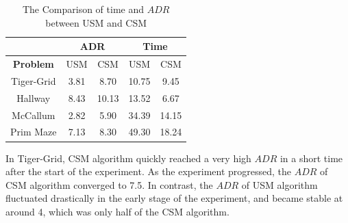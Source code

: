 \documentclass[conference]{IEEEtran}
\begin{document}
	\begin{table}[b]
		\caption{The Comparison of time and $ADR$ between USM and CSM}
		\begin{center}
			\begin{tabular}{|c|c|c|c|c|}
				\hline
				&\multicolumn{2}{|c|}{\textbf{ADR}} &\multicolumn{2}{|c|}{\textbf{Time}} \\
				\hline
				\textbf{Problem}      & USM         & CSM               &USM           & CSM      \\
				\hline
				Tiger-Grid    & 3.81        & 8.70              & 10.75        & 9.45     \\ 
				Hallway       & 8.43        & 10.13             & 13.52        & 6.67     \\ 
				McCallum      & 2.82        & 5.90              & 34.39        & 14.15    \\ 
				Prim Maze     & 7.13        & 8.30              & 49.30        & 18.24    \\ 
				\hline
			\end{tabular}
			
			\label{table:results}
		\end{center}
	\end{table}
	
	
	
	In Tiger-Grid, CSM algorithm quickly reached a very high $ADR$ in a short
	time after the start of the experiment. As the experiment progressed, the $ADR$ of
	CSM algorithm converged to 7.5. In contrast, the $ADR$ of USM algorithm fluctuated
	drastically in the early stage of the experiment, and became stable at around 4, which
	was only half of the CSM algorithm.
	
\end{document}
